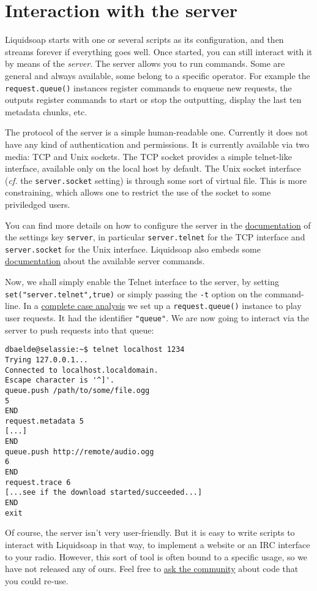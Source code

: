 \section{Interaction with the server}
Liquidsoap starts with one or several scripts as its configuration,
and then streams forever if everything goes well.
Once started, you can still interact with it by means of the \emph{server}.
The server allows you to run commands. Some are general and always available,
some belong to a specific operator. For example the \verb+request.queue()+ instances register commands to enqueue new requests, the outputs register commands
to start or stop the outputting, display the last ten metadata chunks, etc.

The protocol of the server is a simple human-readable one.
Currently it does not have any kind of authentication and permissions.
It is currently available via two media: TCP and Unix sockets.
The TCP socket provides a simple telnet-like interface, available only on
the local host by default.
The Unix socket interface (\emph{cf.} the \verb+server.socket+ setting)
is through some sort of virtual file.
This is more constraining, which allows one to restrict the use of the socket
to some priviledged users.

You can find more details on how to configure the server in the
\href{help.html#settings}{documentation} of the settings key \verb+server+,
in particular \verb+server.telnet+ for the TCP interface and \verb+server.socket+
for the Unix interface.
Liquidsoap also embeds some \href{help.html#server}{documentation}
about the available server commands.

Now, we shall simply enable the Telnet interface to the server,
by setting \verb+set("server.telnet",true)+ or simply passing the \verb+-t+ option on
the command-line.
In a \href{complete_case.html}{complete case analysis} we set up a \verb+request.queue()+
instance to play user requests. It had the identifier \verb+"queue"+.
We are now going to interact via the server to push requests into that queue:

\begin{verbatim}
dbaelde@selassie:~$ telnet localhost 1234
Trying 127.0.0.1...
Connected to localhost.localdomain.
Escape character is '^]'.
queue.push /path/to/some/file.ogg
5
END
request.metadata 5
[...]
END
queue.push http://remote/audio.ogg
6
END
request.trace 6
[...see if the download started/succeeded...]
END
exit
\end{verbatim}
Of course, the server isn't very user-friendly.
But it is easy to write scripts to interact with Liquidsoap in that way,
to implement a website or an IRC interface to your radio.
However, this sort of tool is often bound to a specific usage, so we have
not released any of ours. Feel free to
\href{mailto:savonet-users@lists.sf.net}{ask the community}
about code that you could re-use.

